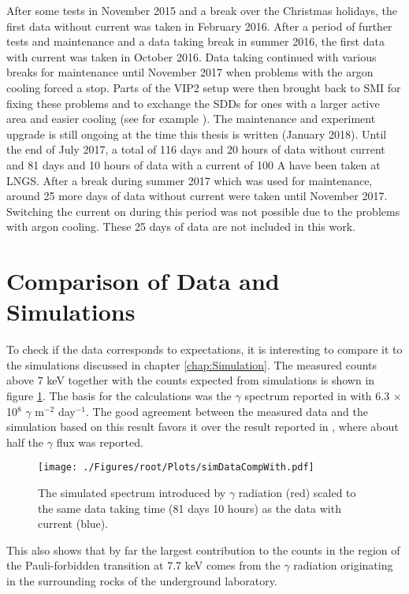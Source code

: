 After some tests in November 2015 and a break over the Christmas holidays, the first data without current was taken in February 2016. After a period of further tests and maintenance and a data taking break in summer 2016, the first data with current was taken in October 2016. Data taking continued with various breaks for maintenance until November 2017 when problems with the argon cooling forced a stop. Parts of the VIP2 setup were then brought back to SMI for fixing these problems and to exchange the SDDs for ones with a larger active area and easier cooling (see for example \cite{Pichler2017}). The maintenance and experiment upgrade is still ongoing at the time this thesis is written (January 2018). Until the end of July 2017, a total of 116 days and 20 hours of data without current and 81 days and 10 hours of data with a current of 100 A have been taken at LNGS. After a break during summer 2017 which was used for maintenance, around 25 more days of data without current were taken until November 2017. Switching the current on during this period was not possible due to the problems with argon cooling. These 25 days of data are not included in this work. 

\section{Comparison of Data and Simulations}
\label{sec:dataSimCompLngs}

To check if the data corresponds to expectations, it is interesting to compare it to the simulations discussed in chapter \ref{chap:Simulation}. The measured counts above 7 keV together with the counts expected from simulations is shown in figure \ref{fig:simDataLngs}. The basis for the calculations was the $\gamma$ spectrum reported in \cite{Bucci2009} with 6.3 $\times$ 10$^{8}$ $\gamma$ m$^{-2}$ day$^{-1}$. The good agreement between the measured data and the simulation based on this result favors it over the result reported in \cite{Haffke2011}, where about half the $\gamma$ flux was reported. 
\begin{figure}[h]
 \centering
 \texttt{[image: ./Figures/root/Plots/simDataCompWith.pdf]}
 \caption{The simulated spectrum introduced by $\gamma$ radiation (red) scaled to the same data taking time (81 days 10 hours) as the data with current (blue).}
 \label{fig:simDataLngs}
\end{figure}
This also shows that by far the largest contribution to the counts in the region of the Pauli-forbidden transition at 7.7 keV comes from the $\gamma$ radiation originating in the surrounding rocks of the underground laboratory.

